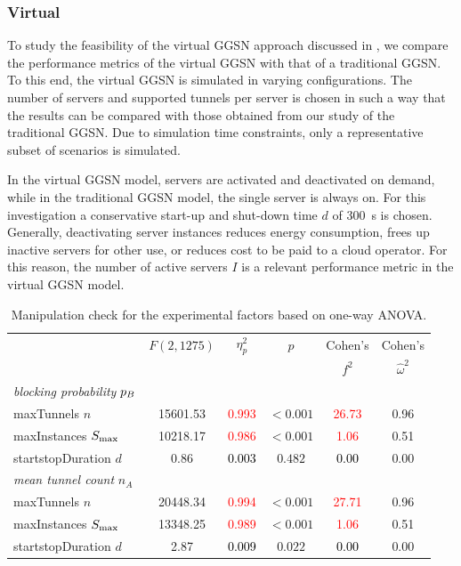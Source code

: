 \subsubsection*{Virtual }\label{sec:cloud:virtualized_network_functions:performance_evaluation:virtual_ggsn}

To study the feasibility of the virtual \gls{GGSN} approach discussed in , we compare the performance metrics of the virtual \gls{GGSN} with that of a traditional \gls{GGSN}.
To this end, the virtual \gls{GGSN} is simulated in varying configurations.
The number of servers and supported tunnels per server is chosen in such a way that the results can be compared with those obtained from our study of the traditional \gls{GGSN}.
Due to simulation time constraints, only a representative subset of scenarios is simulated.

In the virtual \gls{GGSN} model, servers are activated and deactivated on demand, while in the traditional \gls{GGSN} model, the single server is always on.
For this investigation a conservative start-up and shut-down time \(d\) of \SI{300}{\second} is chosen.
Generally, deactivating server instances reduces energy consumption, frees up inactive servers for other use, or reduces cost to be paid to a cloud operator.
For this reason, the number of active servers \(I\) is a relevant performance metric in the virtual \gls{GGSN} model.

\begin{table}\caption{Manipulation check for the experimental factors based on one-way ANOVA.}
\centering
\label{tab:cloud:virtualized_network_functions:performance_evaluation:virtual_ggsn:manipulation}
\tabcolsep=0.11cm
\begin{tabular}{lccccc}
\toprule
& \(F(2,1275)\) & \(\eta^2_p\) & \(p\) & Cohen's & Cohen's\\
&  & & & \(f^2\) & \(\hat{\omega}^2\) \\
\midrule
\emph{blocking probability} \(p_B\)  & & & & &\\
maxTunnels \(n\)&  15601.53 & \textcolor{red}{0.993} & $<0.001$ & \textcolor{red}{26.73} & 0.96\\
maxInstances \(S_{\max}\)&  10218.17 & \textcolor{red}{0.986} & $<0.001$ & \textcolor{red}{1.06} & 0.51\\
startstopDuration \(d\) &  0.86 & \textcolor{black}{0.003} & $0.482$ & \textcolor{black}{0.00} & 0.00\\
\midrule
\emph{mean tunnel count} \(n_A\) & & & & &\\
maxTunnels \(n\)&  20448.34 & \textcolor{red}{0.994} & $<0.001$ & \textcolor{red}{27.71} & 0.96\\
maxInstances \(S_{\max}\)&  13348.25 & \textcolor{red}{0.989} & $<0.001$ & \textcolor{red}{1.06} & 0.51\\
startstopDuration \(d\) &  2.87 & \textcolor{black}{0.009} & $0.022$ & \textcolor{black}{0.00} & 0.00\\
\bottomrule
\end{tabular}
\end{table}


